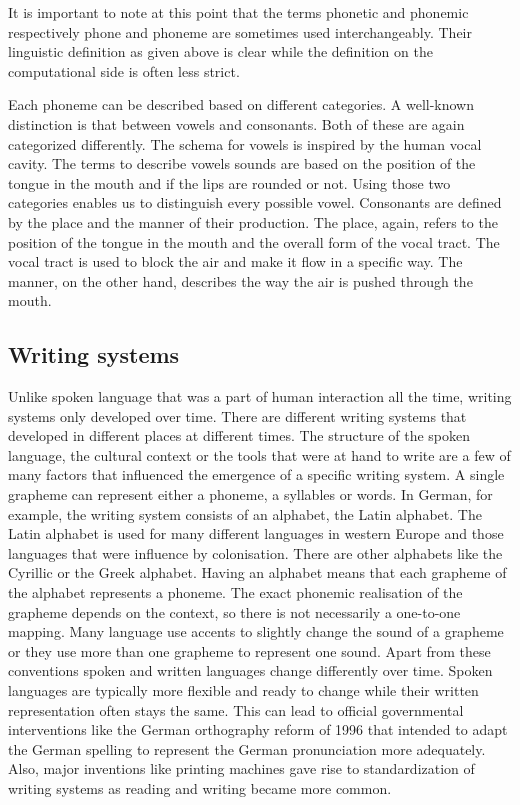It is important to note at this point that the terms phonetic and phonemic respectively phone and phoneme are sometimes used interchangeably. Their linguistic definition as given above is clear while the definition on the computational side is often less strict. 

Each phoneme can be described based on different categories. A well-known distinction is that between vowels and consonants. Both of these are again categorized differently. The schema for vowels is inspired by the human vocal cavity. The terms to describe vowels sounds are based on the position of the tongue in the mouth and if the lips are rounded or not. Using those two categories enables us to distinguish every possible vowel. Consonants are defined by the place and the manner of their production. The place, again, refers to the position of the tongue in the mouth and the overall form of the vocal tract. The vocal tract is used to block the air and make it flow in a specific way. The manner, on the other hand, describes the way the air is pushed through the mouth.



\subsection*{Writing systems}
\label{writing-sys}
Unlike spoken language that was a part of human interaction all the time, writing systems only developed over time. There are different writing systems that developed in different places at different times. The structure of the spoken language, the cultural context or the tools that were at hand to write are a few of many factors that influenced the emergence of a specific writing system. A single grapheme can represent either a phoneme, a syllables or words. In German, for example, the writing system consists of an alphabet, the Latin alphabet.  The Latin alphabet is used for many different languages in western Europe and those languages that were influence by colonisation. There are other alphabets like the Cyrillic or the Greek alphabet. Having an alphabet means that each grapheme of the alphabet represents a phoneme. The exact phonemic realisation of the grapheme depends on the context, so there is not necessarily a one-to-one mapping. Many language use accents to slightly change the sound of a grapheme or they use more than one grapheme to represent one sound. Apart from these conventions spoken and written languages change differently over time. Spoken languages are typically more flexible and ready to change while their written representation often stays the same. This can lead to official governmental interventions like the German orthography reform of 1996 that intended to adapt the German spelling to represent the German pronunciation more adequately. Also, major inventions like printing machines gave rise to standardization of writing systems as reading and writing became more common.

